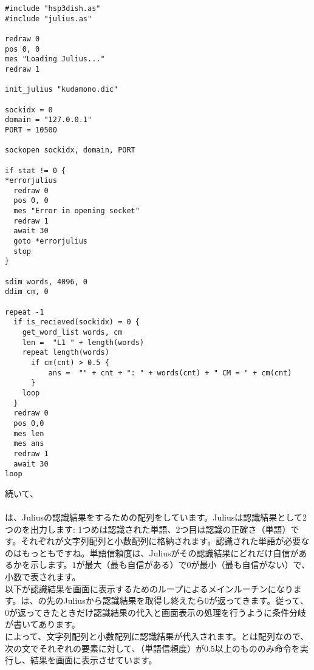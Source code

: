 \begin{lstlisting}[caption=julius.hsp,label=julius.hsp]
#include "hsp3dish.as"
#include "julius.as"

redraw 0
pos 0, 0
mes "Loading Julius..."
redraw 1

init_julius "kudamono.dic"

sockidx = 0
domain = "127.0.0.1"
PORT = 10500

sockopen sockidx, domain, PORT

if stat != 0 {
*errorjulius
  redraw 0
  pos 0, 0
  mes "Error in opening socket"
  redraw 1
  await 30
  goto *errorjulius
  stop
}

sdim words, 4096, 0
ddim cm, 0

repeat -1
  if is_recieved(sockidx) = 0 {
    get_word_list words, cm
    len =  "L1 " + length(words)
    repeat length(words)
      if cm(cnt) > 0.5 {
          ans =  "" + cnt + ": " + words(cnt) + " CM = " + cm(cnt)
      }
    loop
  }
  redraw 0
  pos 0,0
  mes len
  mes ans
  redraw 1
  await 30
loop
\end{lstlisting}

続いて、\\
\\
は、Juliusの認識結果をするための配列をしています。Juliusは認識結果として2つのを出力します: 1つめは認識された単語、2つ目は認識の正確さ（単語）です。それぞれが文字列配列と小数配列に格納されます。認識された単語が必要なのはもっともですね。単語信頼度は、Juliusがその認識結果にどれだけ自信があるかを示します。1が最大（最も自信がある）で0が最小（最も自信がない）で、小数で表されます。\\
以下が認識結果を画面に表示するためのループによるメインルーチンになります。は、の先のJuliusから認識結果を取得し終えたら0が返ってきます。従って、0が返ってきたときだけ認識結果の代入と画面表示の処理を行うように条件分岐が書いてあります。\\
によって、文字列配列と小数配列に認識結果が代入されます。とは配列なので、次の文でそれぞれの要素に対して、（単語信頼度）が0.5以上のもののみ命令を実行し、結果を画面に表示させています。\\
\begin{tcolorbox}[title=\useOmetoi]
\begin{enumerate}
\end{enumerate}
\end{tcolorbox}
